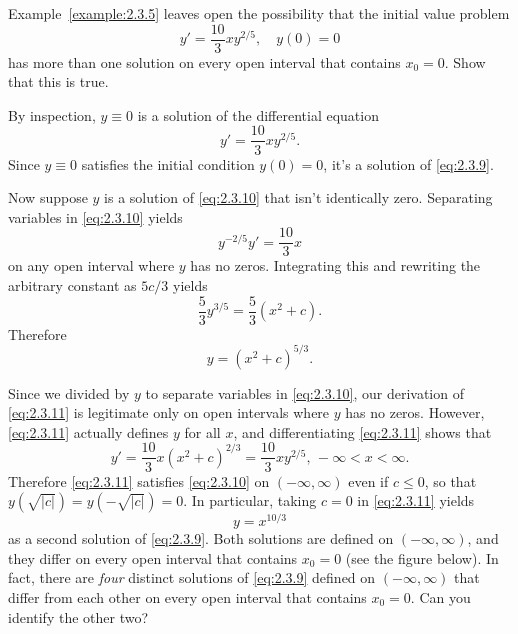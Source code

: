 \documentclass{ximera}
\begin{document}
\begin{example}\label{example:2.3.6}
Example~\ref{example:2.3.5} leaves open the possibility  that the
initial value problem
\begin{equation} \label{eq:2.3.9}
y'=\frac{10}{3}xy^{2/5}, \quad y(0)=0
\end{equation}
has more than one solution on every open interval that contains $x_0=0$.  Show
that this is true.

\begin{explanation}
By inspection, $y\equiv0$ is a solution of the
differential equation
\begin{equation} \label{eq:2.3.10}
y'=\frac{10}{3} xy ^{2/5}.
\end{equation}
 Since $y\equiv0$ satisfies the initial condition $y(0)=0$,
it's a solution of \eqref{eq:2.3.9}.

Now suppose  $y$ is a solution of \eqref{eq:2.3.10} that isn't
identically zero.
 Separating variables in \eqref{eq:2.3.10} yields
$$
 y^{-2/5}y'=\frac{10}{3}x
$$
on any open interval where $y$ has no zeros.
 Integrating this and rewriting the arbitrary constant as $5c/3$ yields
$$
\frac{5}{3}y^{3/5} = \frac{5}{3}(x^2+c).
$$
Therefore
\begin{equation} \label{eq:2.3.11}
y = (x^2+c)^{5/3}.
\end{equation}

Since we divided by $y$ to separate variables in \eqref{eq:2.3.10}, our
derivation of \eqref{eq:2.3.11} is legitimate only on open intervals where $y$
has no zeros. However, \eqref{eq:2.3.11} actually defines $y$ for all $x$,
and differentiating \eqref{eq:2.3.11} shows that
$$
y'=\frac{10}{3}x(x^2+c)^{2/3}=\frac{10}{3}xy^{2/5},\,-\infty<x<\infty.
$$
Therefore \eqref{eq:2.3.11} satisfies \eqref{eq:2.3.10} on
$(-\infty,\infty)$
even if $c\le 0$, so that $y(\sqrt{|c|})=y(-\sqrt{|c|})=0$. In
particular, taking $c=0$ in \eqref{eq:2.3.11} yields
$$
y=x^{10/3}
$$
as a second solution of \eqref{eq:2.3.9}.
 Both solutions are defined on
$(-\infty,\infty)$, and they differ on every
open interval that contains $x_0=0$ (see the figure below).
In fact, there are \textit{four} distinct solutions of
\eqref{eq:2.3.9}  defined on $(-\infty,\infty)$ that differ
from each other on every open interval that contains $x_0=0$.
  Can you identify the other two?

\end{explanation}
\end{example}
\end{document}
